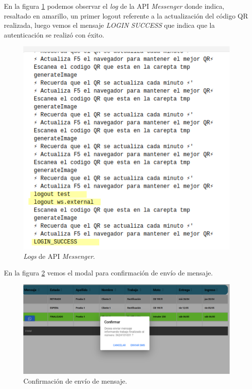 En la figura \ref{fig:ensayomensajeapi} podemos observar el \textit{log} de la API \textit{Messenger} donde indica, resaltado en amarillo, un primer logout referente a la actualización del código QR realizada, luego vemos el mensaje \textit{LOGIN SUCCESS} que indica que la autenticación se realizó con éxito.

\begin{figure}[H]
	\centering
	\includegraphics[scale=.70]{./Figures/ensayo-1/15-qr-api.png}
	\caption{\textit{Logs} de API \textit{Messenger}.}
	\label{fig:ensayomensajeapi}
\end{figure}	

En la figura \ref{fig:ensayoconfirmacionmensaje} vemos el modal para confirmación de envío de mensaje.

\begin{figure}[H]
	\centering
	\includegraphics[width=\textwidth]{./Figures/ensayo-1/14.mensaje-confirmacion.png}
	\caption{Confirmación de envío de mensaje.}
	\label{fig:ensayoconfirmacionmensaje}
\end{figure}

